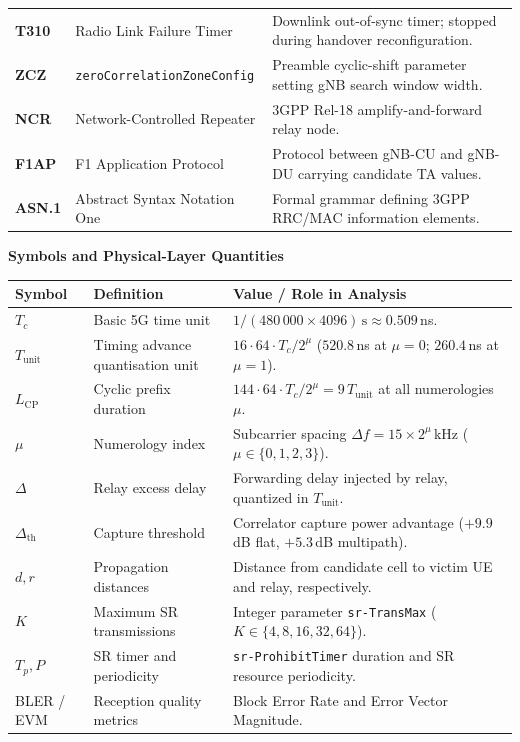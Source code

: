 {\begin{center}
\begin{tabularx}{\textwidth}{@{}l p{4.9cm} X@{}}
\textbf{T310} & Radio Link Failure Timer & Downlink out-of-sync timer; stopped during handover reconfiguration. \\
\textbf{ZCZ} & \texttt{zero\-Correlation\-Zone\-Config} & Preamble cyclic-shift parameter setting gNB search window width. \\
\textbf{NCR} & Network-Controlled Repeater & 3GPP Rel-18 amplify-and-forward relay node. \\
\textbf{F1AP} & F1 Application Protocol & Protocol between gNB-CU and gNB-DU carrying candidate TA values. \\
\textbf{ASN.1} & Abstract Syntax Notation One & Formal grammar defining 3GPP RRC/MAC information elements. \\
\bottomrule
\end{tabularx}
\end{center}

\vspace{-0.6em}
\noindent\textbf{Symbols and Physical-Layer Quantities}
\vspace{-0.4em}
\begin{center}
\begin{tabularx}{\textwidth}{@{}l p{4.9cm} X@{}}
\toprule
\textbf{Symbol} & \textbf{Definition} & \textbf{Value / Role in Analysis} \\
\midrule
$T_c$ & Basic 5G time unit & $1/(480\,000 \times 4096)\,\text{s} \approx 0.509$\,ns. \\
$T_{\mathrm{unit}}$ & Timing advance quantisation unit & $16 \cdot 64 \cdot T_c / 2^{\mu}$ ($520.8$\,ns at $\mu=0$; $260.4$\,ns at $\mu=1$). \\
$L_{\mathrm{CP}}$ & Cyclic prefix duration & $144 \cdot 64 \cdot T_c / 2^{\mu} = 9\,T_{\mathrm{unit}}$ at all numerologies $\mu$. \\
$\mu$ & Numerology index & Subcarrier spacing $\Delta f = 15 \times 2^{\mu}$\,kHz ($\mu \in \{0, 1, 2, 3\}$). \\
$\Delta$ & Relay excess delay & Forwarding delay injected by relay, quantized in $T_{\mathrm{unit}}$. \\
$\Delta_{\mathrm{th}}$ & Capture threshold & Correlator capture power advantage ($+9.9$\,dB flat, $+5.3$\,dB multipath). \\
$d, r$ & Propagation distances & Distance from candidate cell to victim UE and relay, respectively. \\
$K$ & Maximum SR transmissions & Integer parameter \texttt{sr-TransMax} ($K \in \{4, 8, 16, 32, 64\}$). \\
$T_p, P$ & SR timer and periodicity & \texttt{sr-ProhibitTimer} duration and SR resource periodicity. \\
BLER / EVM & Reception quality metrics & Block Error Rate and Error Vector Magnitude. \\
\bottomrule
\end{tabularx}
\end{center}
}
